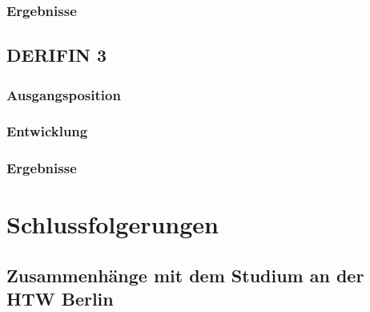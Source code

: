 \documentclass{article}
\begin{document}
    \subsubsection{Ergebnisse}

    \subsection{DERIFIN 3}

    \subsubsection{Ausgangsposition}

    \subsubsection{Entwicklung}

    \subsubsection{Ergebnisse}

    \section{Schlussfolgerungen}

    \subsection{Zusammenh\"ange mit dem Studium an der HTW Berlin}
\end{document}
